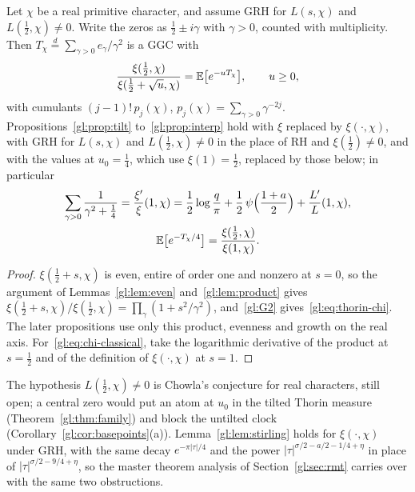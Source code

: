 \begin{proposition}\label{gl:prop:Lreal}
Let $\chi$ be a real primitive character, and assume GRH for $L(s,\chi)$ and $L(\tfrac12,\chi)\neq0$. Write the zeros as $\tfrac12\pm i\gamma$ with $\gamma>0$, counted with multiplicity. Then $T_\chi\stackrel{d}{=}\sum_{\gamma>0}e_\gamma/\gamma^2$ is a GGC with
\begin{equation}\label{gl:eq:thorin-chi}
\frac{\xi(\tfrac12,\chi)}{\xi(\tfrac12+\sqrt u,\chi)} = \mathbb{E}\big[e^{-uT_\chi}\big],\qquad u \ge 0,
\end{equation}
with cumulants $(j-1)!\,p_j(\chi)$, $p_j(\chi)=\sum_{\gamma>0}\gamma^{-2j}$. Propositions~\ref{gl:prop:tilt} to~\ref{gl:prop:interp} hold with $\xi$ replaced by $\xi(\cdot,\chi)$, with GRH for $L(s,\chi)$ and $L(\tfrac12,\chi)\neq0$ in the place of RH and $\xi(\tfrac12)\neq0$, and with the values at $u_0=\tfrac14$, which use $\xi(1)=\tfrac12$, replaced by those below; in particular
\begin{gather}
\sum_{\gamma>0}\frac{1}{\gamma^2+\tfrac14} = \frac{\xi'}{\xi}(1,\chi) = \frac12\log\frac q\pi+\frac12\,\psi\Big(\frac{1+a}{2}\Big)+\frac{L'}{L}(1,\chi),\label{gl:eq:chi-classical}\\
\mathbb{E}\big[e^{-T_\chi/4}\big] = \frac{\xi(\tfrac12,\chi)}{\xi(1,\chi)}.\notag
\end{gather}
\end{proposition}

\begin{proof}
$\xi(\tfrac12+s,\chi)$ is even, entire of order one and nonzero at $s=0$, so the argument of Lemmas~\ref{gl:lem:even} and~\ref{gl:lem:product} gives $\xi(\tfrac12+s,\chi)/\xi(\tfrac12,\chi)=\prod_\gamma(1+s^2/\gamma^2)$, and~\ref{gl:G2} gives~\eqref{gl:eq:thorin-chi}. The later propositions use only this product, evenness and growth on the real axis. For~\eqref{gl:eq:chi-classical}, take the logarithmic derivative of the product at $s=\tfrac12$ and of the definition of $\xi(\cdot,\chi)$ at $s=1$.
\end{proof}

The hypothesis $L(\tfrac12,\chi)\neq0$ is Chowla's conjecture for real characters, still open; a central zero would put an atom at $u_0$ in the tilted Thorin measure (Theorem~\ref{gl:thm:family}) and block the untilted clock (Corollary~\ref{gl:cor:basepoints}(a)). Lemma~\ref{gl:lem:stirling} holds for $\xi(\cdot,\chi)$ under GRH, with the same decay $e^{-\pi|\tau|/4}$ and the power $|\tau|^{\sigma/2-a/2-1/4+\eta}$ in place of $|\tau|^{\sigma/2-9/4+\eta}$, so the master theorem analysis of Section~\ref{gl:sec:rmt} carries over with the same two obstructions.

